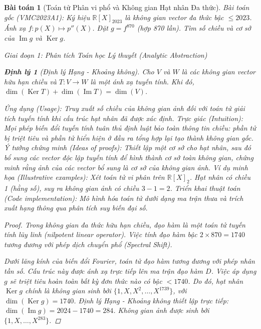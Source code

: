 \documentclass{article}
\newtheorem{baitoan}{Bài toán}
\newtheorem{dinhly}{Định lý}
\begin{document}

\begin{baitoan}[Toán tử Phân vi phổ và Không gian Hạt nhân Đa thức]
 \emph{Bài toán gốc (VMC2023A1):} 
 Ký hiệu $\mathbb{R}[X]_{2023}$ là không gian vector đa thức bậc $\le 2023$. Ánh xạ $f: p(X) \mapsto p''(X)$. Đặt $g = f^{870}$ (hợp 870 lần). Tìm số chiều và cơ sở của $\operatorname{Im}g$ và $\operatorname{Ker}g$.

\vspace{0.5em}\noindent\emph{Giai đoạn 1: Phân tích Toán học Lý thuyết (Analytic Abstraction)}
 
\begin{dinhly}[Định lý Hạng - Khoảng không]
Cho $V$ và $W$ là các không gian vector hữu hạn chiều và $T: V \to W$ là một ánh xạ tuyến tính. Khi đó, $\dim(\operatorname{Ker}T) + \dim(\operatorname{Im}T) = \dim(V)$.
\end{dinhly}
\emph{Ứng dụng (Usage):} Truy xuất số chiều của không gian ảnh đối với toán tử giải tích tuyến tính khi cấu trúc hạt nhân đã được xác định.
\emph{Trực giác (Intuition):} Mọi phép biến đổi tuyến tính tuân thủ định luật bảo toàn thông tin chiều: phần tử bị triệt tiêu và phần tử hiển hiện ở đầu ra tổng hợp lại tạo thành không gian gốc.
\emph{Ý tưởng chứng minh (Ideas of proofs):} Thiết lập một cơ sở cho hạt nhân, sau đó bổ sung các vector độc lập tuyến tính để hình thành cơ sở toàn không gian, chứng minh rằng ảnh của các vector bổ sung là cơ sở của không gian ảnh.
\emph{Ví dụ minh họa (Illustrative examples):} Xét toán tử vi phân trên $\mathbb{R}[X]_2$. Hạt nhân có chiều 1 (hằng số), suy ra không gian ảnh có chiều $3 - 1 = 2$.
\emph{Triển khai thuật toán (Code implementation):} Mô hình hóa toán tử dưới dạng ma trận thưa và trích xuất hạng thông qua phân tích suy biến đại số.

 \begin{proof}
 Trong không gian đa thức hữu hạn chiều, đạo hàm là một toán tử tuyến tính lũy linh (nilpotent linear operator). Việc tính đạo hàm bậc $2 \times 870 = 1740$ tương đương với phép dịch chuyển phổ (Spectral Shift).

  Dưới lăng kính của biến đổi Fourier, toán tử đạo hàm tương đương với phép nhân tần số. Cấu trúc này được ánh xạ trực tiếp lên ma trận đạo hàm $D$. Việc áp dụng $g$ sẽ triệt tiêu hoàn toàn bất kỳ đơn thức nào có bậc $< 1740$. Do đó, hạt nhân $\operatorname{Ker}g$ chính là không gian sinh bởi $\{1, X, X^2, \dots, X^{1739}\}$, với $\dim(\operatorname{Ker}g) = 1740$. 
 \emph{Định lý Hạng - Khoảng không} thiết lập trực tiếp: $\dim(\operatorname{Im}g) = 2024 - 1740 = 284$. Không gian ảnh được sinh bởi $\{1, X, \dots, X^{283}\}$.
 \end{proof}


\end{baitoan}
\end{document}
